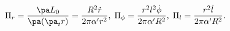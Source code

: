 \begin{equation}
\Pi_r = \frac{\pa L_0}{\pa(\pa_tr)} = \frac{R^2\dot{r}}{2\pi\alpha'r^2},
\; \Pi_{\phi} = \frac{r^2l^2\dot{\phi}}{2\pi\alpha'R^2}, \;
\Pi_l = \frac{r^2\dot{l}}{2\pi\alpha'R^2}.
\end{equation}


